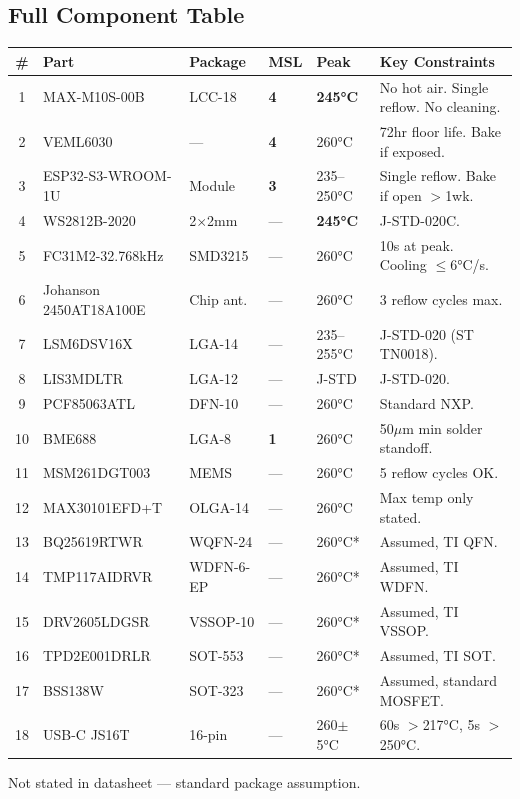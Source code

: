 \documentclass[11pt,a4paper]{article}
\begin{document}
\subsection*{Full Component Table}

{\small
\begin{table}[H]
\centering
\renewcommand{\arraystretch}{1.15}
\begin{tabular}{@{}clllll@{}}
\toprule
\textbf{\#} & \textbf{Part} & \textbf{Package} & \textbf{MSL} & \textbf{Peak} & \textbf{Key Constraints} \\
\midrule
\rowcolor{danger!8}
1 & MAX-M10S-00B & LCC-18 & \textbf{4} & \textbf{245°C} & No hot air. Single reflow. No cleaning. \\
\rowcolor{danger!8}
2 & VEML6030 & — & \textbf{4} & 260°C & 72hr floor life. Bake if exposed. \\
\rowcolor{warning!8}
3 & ESP32-S3-WROOM-1U & Module & \textbf{3} & 235--250°C & Single reflow. Bake if open $>$1wk. \\
\rowcolor{danger!8}
4 & WS2812B-2020 & 2$\times$2mm & — & \textbf{245°C} & J-STD-020C. \\
5 & FC31M2-32.768kHz & SMD3215 & — & 260°C & 10s at peak. Cooling $\leq$6°C/s. \\
6 & Johanson 2450AT18A100E & Chip ant. & — & 260°C & 3 reflow cycles max. \\
7 & LSM6DSV16X & LGA-14 & — & 235--255°C & J-STD-020 (ST TN0018). \\
8 & LIS3MDLTR & LGA-12 & — & J-STD & J-STD-020. \\
9 & PCF85063ATL & DFN-10 & — & 260°C & Standard NXP. \\
10 & BME688 & LGA-8 & \textbf{1} & 260°C & 50$\mu$m min solder standoff. \\
11 & MSM261DGT003 & MEMS & — & 260°C & 5 reflow cycles OK. \\
12 & MAX30101EFD+T & OLGA-14 & — & 260°C & Max temp only stated. \\
13 & BQ25619RTWR & WQFN-24 & — & 260°C* & Assumed, TI QFN. \\
14 & TMP117AIDRVR & WDFN-6-EP & — & 260°C* & Assumed, TI WDFN. \\
15 & DRV2605LDGSR & VSSOP-10 & — & 260°C* & Assumed, TI VSSOP. \\
16 & TPD2E001DRLR & SOT-553 & — & 260°C* & Assumed, TI SOT. \\
17 & BSS138W & SOT-323 & — & 260°C* & Assumed, standard MOSFET. \\
18 & USB-C JS16T & 16-pin & — & 260$\pm$5°C & 60s $>$217°C, 5s $>$250°C. \\
\bottomrule
\end{tabular}
\end{table}
}
{\footnotesize *Not stated in datasheet — standard package assumption.}
\end{document}
